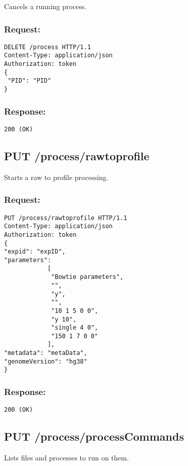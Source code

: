 Cancels a running process.

\subsubsection*{Request:}
\begin{verbatim}
DELETE /process HTTP/1.1
Content-Type: application/json
Authorization: token
{
 "PID": "PID"
}
\end{verbatim}

\subsubsection*{Response:}
\begin{verbatim}
200 (OK)
\end{verbatim}

\subsection*{PUT /process/rawtoprofile}

Starts a raw to profile processing.

\subsubsection*{Request:}
\begin{verbatim}
PUT /process/rawtoprofile HTTP/1.1
Content-Type: application/json
Authorization: token
{
"expid": "expID",
"parameters": 
            [
             "Bowtie parameters",
             "",
             "y",
             "",
             "10 1 5 0 0",
             "y 10",
             "single 4 0",
             "150 1 7 0 0"
            ],
"metadata": "metaData",
"genomeVersion": "hg38"
}
\end{verbatim}

\subsubsection*{Response:}
\begin{verbatim}
200 (OK)
\end{verbatim}

\subsection*{PUT /process/processCommands}

Lists files and processes to run on them.

